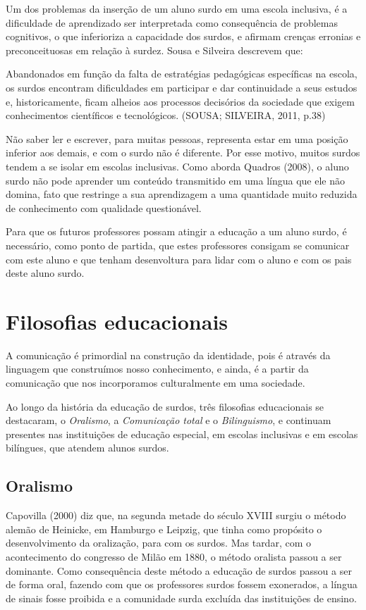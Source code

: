 \documentclass[brasil]{abnt}
\begin{document}
	Um dos problemas da inserção de um aluno surdo em uma escola inclusiva, é a dificuldade de aprendizado ser interpretada como consequência de problemas cognitivos, o que inferioriza
	a capacidade dos surdos, e afirmam crenças erronias e preconceituosas em relação à surdez. Sousa e Silveira descrevem que:
	
		\begin{citacao} Abandonados em função da falta de estratégias pedagógicas específicas na escola, os surdos encontram dificuldades em participar e dar continuidade a
						seus estudos e, historicamente, ficam alheios aos processos 
						decisórios da sociedade que exigem conhecimentos científicos e 
						tecnológicos. (SOUSA; SILVEIRA, 2011, p.38)
		\end{citacao}
		
	Não saber ler e escrever, para muitas pessoas, representa estar em uma posição inferior aos demais, e com o surdo não é diferente. Por esse motivo, muitos surdos tendem a se isolar em
	escolas inclusivas. Como aborda Quadros (2008), o aluno surdo não pode aprender um conteúdo transmitido em uma língua que ele não domina, fato que restringe a sua aprendizagem a uma 
	quantidade muito reduzida de conhecimento com qualidade questionável. 
	
	Para que os futuros professores possam atingir a educação a um aluno surdo, é necessário, como ponto de partida, que estes professores consigam se comunicar com este aluno e que tenham desenvoltura 
	para lidar com o aluno e com os pais deste aluno surdo.

\chapter{Filosofias educacionais}
		A comunicação é primordial na construção da identidade, pois é através da linguagem que construímos nosso conhecimento, e ainda, é a partir da comunicação que nos incorporamos culturalmente em uma 
		sociedade. 
		
		Ao longo da história da educação de surdos, três filosofias educacionais se destacaram, o \textit{Oralismo}, a \textit{Comunicação total} e o \textit{Bilinguismo}, e continuam presentes 
		nas instituições de educação especial, em escolas inclusivas e em escolas bilíngues, que atendem alunos surdos.
		
		\section{Oralismo}
		 Capovilla (2000) diz que, na segunda metade do século XVIII surgiu o método alemão de Heinicke, em Hamburgo e Leipzig, que tinha como propósito o desenvolvimento da oralização, para com os surdos. 
		 Mas tardar, com o acontecimento do congresso de Milão em 1880, o método oralista passou a ser dominante. Como consequência deste método a educação de surdos passou a ser de forma oral, fazendo 
		 com que os professores surdos fossem exonerados, a língua de sinais fosse proibida e a comunidade surda excluída das instituições de ensino. 
		 
\end{document}
